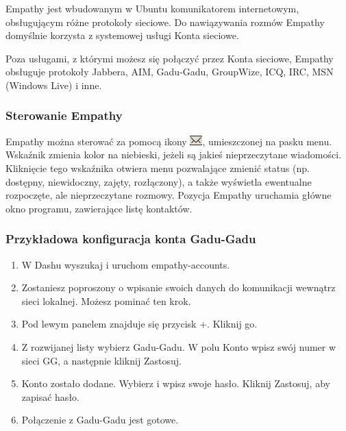 \textcolor{ubuntu_orange}{Empathy} jest wbudowanym w Ubuntu komunikatorem internetowym, obsługującym różne protokoły sieciowe. Do nawiązywania rozmów Empathy domyślnie korzysta z systemowej usługi \textcolor{ubuntu_orange}{Konta sieciowe}.

Poza usługami, z którymi możesz się połączyć przez Konta sieciowe, Empathy obsługuje protokoły Jabbera, AIM, Gadu-Gadu, GroupWize, ICQ, IRC, MSN (Windows Live) i inne.

\subsubsection{Sterowanie Empathy}
Empathy można sterować za pomocą ikony \includegraphics{images/unity_wskaznik_wiadomosci.png}, umieszczonej na pasku menu. Wskaźnik zmienia kolor na niebieski, jeżeli są jakieś nieprzeczytane wiadomości. Kliknięcie tego wskaźnika otwiera menu pozwalające zmienić status (np. dostępny, niewidoczny, zajęty, rozłączony), a także wyświetla ewentualne rozpoczęte, ale nieprzeczytane rozmowy. Pozycja \textcolor{ubuntu_orange}{Empathy} uruchamia główne okno programu, zawierające listę kontaktów.

\subsubsection{Przykładowa konfiguracja konta Gadu-Gadu}
\begin{enumerate}
\item W Dashu wyszukaj i uruchom \textcolor{ubuntu_orange}{empathy-accounts}.
\item Zostaniesz poproszony o wpisanie swoich danych do komunikacji wewnątrz sieci lokalnej. Możesz pominać ten krok.
\item Pod lewym panelem znajduje się przycisk \textcolor{ubuntu_orange}{+}. Kliknij go.
\item \begin{minipage}[t]{\linewidth}
          \raggedright
          
          \medskip
          Z rozwijanej listy wybierz \textcolor{ubuntu_orange}{Gadu-Gadu}. W polu \textcolor{ubuntu_orange}{Konto} wpisz swój numer w sieci GG, a następnie kliknij \textcolor{ubuntu_orange}{Zastosuj}.
    \end{minipage}
\item Konto zostało dodane. Wybierz  i wpisz swoje hasło. Kliknij \textcolor{ubuntu_orange}{Zastosuj}, aby zapisać hasło.
\item Połączenie z Gadu-Gadu jest gotowe.
\end{enumerate}
